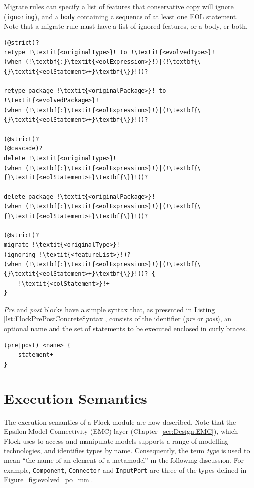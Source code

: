 Migrate rules can specify a list of features that conservative copy will ignore (\texttt{ignoring}), and a \texttt{body} containing a sequence of at least one EOL statement. Note that a migrate rule must have a list of ignored features, or a body, or both.

\begin{lstlisting}[caption={Concrete syntax of Flock retypings, deletions and migrate rules}, label=lst:FlockConcreteSyntax, language=Flock, escapechar=!]
(@strict)?
retype !\textit{<originalType>}! to !\textit{<evolvedType>}!
(when (!\textbf{:}\textit{<eolExpression>}!)|(!\textbf{\{}\textit{<eolStatement>+}\textbf{\}}!))?

retype package !\textit{<originalPackage>}! to !\textit{<evolvedPackage>}!
(when (!\textbf{:}\textit{<eolExpression>}!)|(!\textbf{\{}\textit{<eolStatement>+}\textbf{\}}!))?

(@strict)?
(@cascade)?
delete !\textit{<originalType>}!
(when (!\textbf{:}\textit{<eolExpression>}!)|(!\textbf{\{}\textit{<eolStatement>+}\textbf{\}}!))?

delete package !\textit{<originalPackage>}!
(when (!\textbf{:}\textit{<eolExpression>}!)|(!\textbf{\{}\textit{<eolStatement>+}\textbf{\}}!))?

(@strict)?
migrate !\textit{<originalType>}!
(ignoring !\textit{<featureList>}!)?
(when (!\textbf{:}\textit{<eolExpression>}!)|(!\textbf{\{}\textit{<eolStatement>+}\textbf{\}}!))? {
	!\textit{<eolStatement>}!+
}
\end{lstlisting}

\emph{Pre} and \emph{post} blocks have a simple syntax that, as presented in Listing \ref{lst:FlockPrePostConcreteSyntax}, consists of the identifier (\emph{pre} or \emph{post}), an optional name and the set of statements to be executed enclosed in curly braces.

\begin{lstlisting}[caption=Concrete Syntax of Pre and Post blocks, label=lst:FlockPrePostConcreteSyntax, language=Flock]
(pre|post) <name> {
	statement+
}
\end{lstlisting}

\section{Execution Semantics}
The execution semantics of a Flock module are now described. Note that the Epsilon Model Connectivity (EMC) layer (Chapter~\ref{sec:Design.EMC}), which Flock uses to access and manipulate models supports a range of modelling technologies, and identifies types by name. Consequently, the term \emph{type} is used to mean ``the name of an element of a metamodel'' in the following discussion. For example, \texttt{Co\-mp\-on\-e\-nt}, \texttt{Co\-nn\-ec\-t\-or} and \texttt{In\-p\-utPo\-rt} are three of the types defined in Figure~\ref{fig:evolved_po_mm}.

